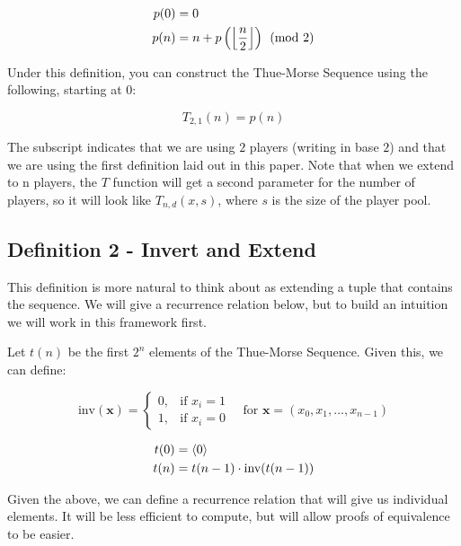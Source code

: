 \documentclass[conference]{IEEEtran}
\begin{document}
\begin{equation}
    \begin{aligned}
        p(0) &= 0 \\
        p(n) &= n + p\left(\left\lfloor \dfrac{n}{2} \right\rfloor\right) \pmod{2}
    \end{aligned}
\end{equation}

Under this definition, you can construct the Thue-Morse Sequence using the following, starting at $0$:

\begin{equation}
    T_{2,1}(n) = p(n)
\end{equation}

The subscript indicates that we are using $2$ players (writing in base $2$) and that we are using the first definition laid out in this paper. Note that when we extend to n players, the $T$ function will get a second parameter for the number of players, so it will look like $T_{n,d}(x, s)$, where $s$ is the size of the player pool.

\subsection{Definition 2 - Invert and Extend}

This definition is more natural to think about as extending a tuple that contains the sequence. We will give a recurrence relation below, but to build an intuition we will work in this framework first.

Let $t(n)$ be the first $2^n$ elements of the Thue-Morse Sequence. Given this, we can define:

\begin{equation}
    \text{inv}(\mathbf{x}) = \begin{cases}
        0, & \text{if } x_i = 1 \\
        1, & \text{if } x_i = 0
    \end{cases} \quad \text{for } \mathbf{x} = (x_0, x_1, \ldots, x_{n-1})
\end{equation}

\begin{equation}
    \begin{aligned}
        t(0) &= \langle 0 \rangle \\
        t(n) &= t(n - 1) \cdot \text{inv}(t(n - 1))
    \end{aligned}
\end{equation}

Given the above, we can define a recurrence relation that will give us individual elements. It will be less efficient to compute, but will allow proofs of equivalence to be easier.
\end{document}
